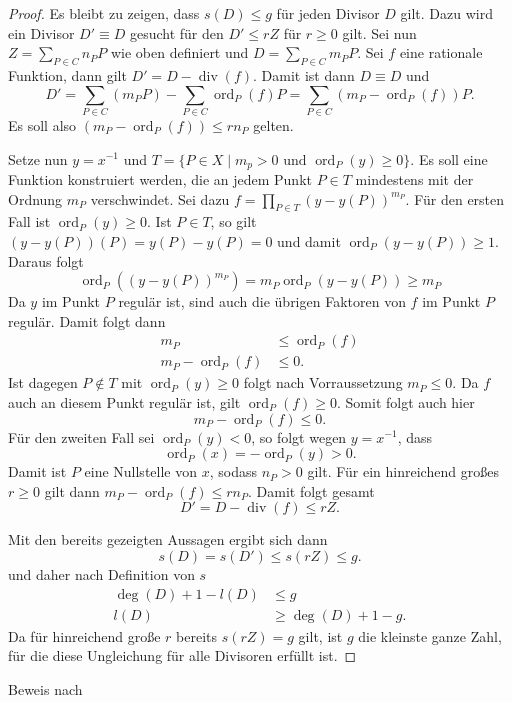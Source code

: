 \begin{proof}
  Es bleibt zu zeigen, dass $s(D)\leq g$ für jeden Divisor $D$ gilt. Dazu wird ein Divisor $D'\equiv D$ gesucht für den $D'\leq rZ$ für $r\geq 0 $ gilt. Sei nun $Z=\sum_{P\in C}n_P P$ wie oben definiert und $D=\sum_{P\in C}m_P P$. Sei $f$ eine rationale Funktion, dann gilt $D'= D - \operatorname{div}(f)$. Damit ist dann $D\equiv D$ und
  \[
    D'= \sum_{P\in C}(m_P P)-\sum_{P\in C}\operatorname{ord}_P(f)P=\sum_{P\in C}(m_P -\operatorname{ord}_P(f))P.
  \]
  Es soll also $(m_P -\operatorname{ord}_P(f))\leq rn_P$ gelten.

  Setze nun $y=x^{-1}$ und $T=\{P\in X\mid m_p>0\text{ und }\operatorname{ord}_P(y)\geq 0\}$. Es soll eine Funktion konstruiert werden, die an jedem Punkt $P\in T$ mindestens mit
  der Ordnung $m_P$ verschwindet. Sei dazu \(f=\prod_{P\in T}(y-y(P))^{m_P}\). Für den ersten Fall ist $\operatorname{ord}_P(y)\geq 0$. Ist $P\in T$, so gilt $(y-y(P))(P)=y(P)-y(P)=0$ und damit $\operatorname{ord}_P(y-y(P))\geq 1$. Daraus folgt
  \[
    \operatorname{ord}_P((y-y(P))^{m_P})=m_P\operatorname{ord}_P(y-y(P))\geq m_P
  \]
  Da $y$ im Punkt $P$ regulär ist, sind auch die übrigen Faktoren von $f$ im Punkt $P$ regulär. Damit folgt dann
  \begin{align*}
    m_P                          & \leq \operatorname{ord}_P(f) \\
    m_P -\operatorname{ord}_P(f) & \leq 0.
  \end{align*}
  Ist dagegen $P\notin T$ mit $\operatorname{ord}_P(y)\geq0$ folgt nach Vorraussetzung $m_P\leq0$. Da $f$ auch an diesem Punkt regulär ist, gilt $\operatorname{ord}_P(f)\geq0$. Somit folgt auch hier
  \[
    m_P-\operatorname{ord}_P(f)\leq0.
  \]
  Für den zweiten Fall sei $\operatorname{ord}_P(y)<0$, so folgt wegen $y=x^{-1}$, dass
  \[
    \operatorname{ord}_P(x)
    =-\operatorname{ord}_P(y)>0.
  \]
  Damit ist $P$ eine Nullstelle von $x$, sodass $n_P>0$ gilt. Für ein hinreichend großes $r\geq 0$ gilt dann \(m_P-\operatorname{ord}_P(f)\leq rn_P\). Damit folgt gesamt
  \[
    D'=D-\operatorname{div}(f)\leq rZ.
  \]

  Mit den bereits gezeigten Aussagen ergibt sich dann
  \[
    s(D)=s(D')\leq s(rZ)\leq g.
  \]
  und daher nach Definition von $s$
  \begin{align*}
    \deg(D)+1-l(D) & \leq g            \\
    l(D)           & \geq \deg(D)+1-g.
  \end{align*}
  Da für hinreichend große $r$ bereits $s(rZ)=g$ gilt, ist $g$ die kleinste ganze Zahl, für die diese Ungleichung für alle Divisoren erfüllt ist.
\end{proof}
Beweis nach \cite[S.101--102]{Fuelton08}



